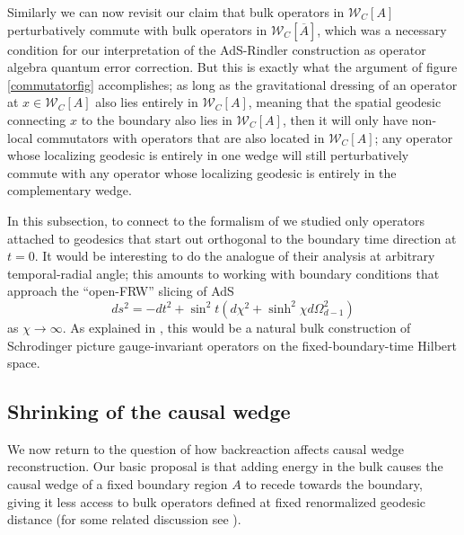\documentclass[11pt]{article}
\newcommand{\be}{\begin{equation}}
\newcommand{\ee}{\end{equation}}
\newcommand{\W}{\mathcal{W}}
\newcommand{\ol}{\overline}
\begin{document}
Similarly we can now revisit our claim that bulk operators in $\W_C[A]$ perturbatively commute with bulk operators in $\W_C[\ol{A}]$, which was a necessary condition for our interpretation of the AdS-Rindler construction as operator algebra quantum error correction.  But this is exactly what the argument of figure \ref{commutatorfig} accomplishes; as long as the gravitational dressing of an operator at $x\in \W_C[A]$ also lies entirely in $\W_C[A]$, meaning that the spatial geodesic connecting $x$ to the boundary also lies in $\W_C[A]$, then it will only have non-local commutators with operators that are also located in $\W_C[A]$; any operator whose localizing geodesic is entirely in one wedge will still perturbatively commute with any operator whose localizing geodesic is entirely in the complementary wedge.

In this subsection, to connect to the formalism of \cite{Kabat:2013wga} we studied only operators attached to geodesics that start out orthogonal to the boundary time direction at $t=0$.  It would be interesting to do the analogue of their analysis at arbitrary temporal-radial angle; this amounts to working with boundary conditions that approach the ``open-FRW'' slicing of AdS
\be
ds^2=-dt^2+\sin^2 t \left(d\chi^2+\sinh^2 \chi d\Omega_{d-1}^2\right)  
\ee
as $\chi\to \infty$.  As explained in \cite{Heemskerk:2012mn}, this would be a natural bulk construction of Schrodinger picture gauge-invariant operators on the fixed-boundary-time Hilbert space.

\subsection{Shrinking of the causal wedge}
We now return to the question of how backreaction affects causal wedge reconstruction.  Our basic proposal is that adding energy in the bulk causes the causal wedge of a fixed boundary region $A$ to recede towards the boundary, giving it less access to bulk operators defined at fixed renormalized geodesic distance (for some related discussion see \cite{Wall:2012uf,Hubeny:2012wa,Hubeny:2012ry,Blanco:2013joa,Headrick:2014cta}).  
\end{document}
